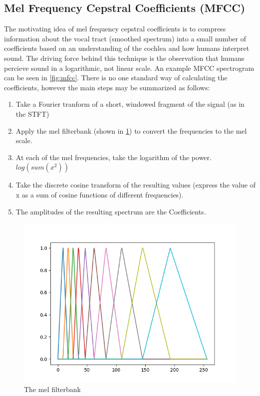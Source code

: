 \documentclass[a4paper, 12pt, twoside]{report}
\begin{document}
\subsection{Mel Frequency Cepstral Coefficients (MFCC)}
\label{sec:org657745a}

The motivating idea of mel frequency cepstral coefficients is to compress information about the vocal tract (smoothed spectrum) into a small number of coefficients based on an understanding of the cochlea and how humans interpret sound. The driving force behind this technique is the observation that humans percieve sound in a logarithmic, not linear scale. An example MFCC spectrogram can be seen in \ref{fig:mfcc}. There is no one standard way of calculating the coefficients, however the main steps may be summarized as follows:

\begin{enumerate}
    \item Take a Fourier tranform of a short, windowed fragment of the signal (as in the STFT)
    \item Apply the mel filterbank (shown in \ref{fig:mel_filterbank}) to convert the frequencies to the mel scale.
    \item At each of the mel frequencies, take the logarithm of the power. $log(sum(x^{2}))$
    \item Take the discrete cosine transform of the resulting values (express the value of x as a sum of cosine functions of different frequencies).
    \item The amplitudes of the resulting spectrum are the Coefficients.
\end{enumerate}

\begin{figure}[h!]
\centering
\includegraphics[width=\textwidth]{./Figures/mel_filterbank.png}
\caption{\label{fig:mel_filterbank}The mel filterbank}
\end{figure}
\end{document}
